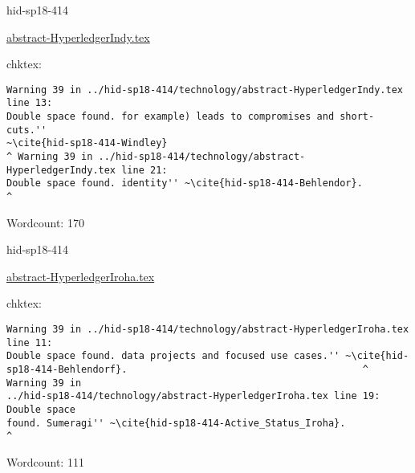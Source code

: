 \begin{IU}

hid-sp18-414

\href{https://github.com/cloudmesh-community/hid-sp18-414/blob/master//technology/abstract-HyperledgerIndy.tex}{abstract-HyperledgerIndy.tex}

 
chktex:
\begin{tiny}
\begin{verbatim}
Warning 39 in ../hid-sp18-414/technology/abstract-HyperledgerIndy.tex line 13:
Double space found. for example) leads to compromises and short-cuts.''
~\cite{hid-sp18-414-Windley}
^ Warning 39 in ../hid-sp18-414/technology/abstract-HyperledgerIndy.tex line 21:
Double space found. identity'' ~\cite{hid-sp18-414-Behlendor}.             ^
\end{verbatim}
\end{tiny}

Wordcount: 170

\end{IU}



\begin{IU}

hid-sp18-414

\href{https://github.com/cloudmesh-community/hid-sp18-414/blob/master//technology/abstract-HyperledgerIroha.tex}{abstract-HyperledgerIroha.tex}

 
chktex:
\begin{tiny}
\begin{verbatim}
Warning 39 in ../hid-sp18-414/technology/abstract-HyperledgerIroha.tex line 11:
Double space found. data projects and focused use cases.'' ~\cite{hid-
sp18-414-Behlendorf}.                                         ^ Warning 39 in
../hid-sp18-414/technology/abstract-HyperledgerIroha.tex line 19: Double space
found. Sumeragi'' ~\cite{hid-sp18-414-Active_Status_Iroha}.             ^
\end{verbatim}
\end{tiny}

Wordcount: 111

\end{IU}



